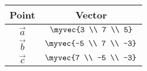 \begin{tabular}{|c|c|}
\hline
Point & Vector \\
\hline
$\vec{a}$ & $\myvec{3 \\ 7 \\ 5}$ \\
\hline
$\vec{b}$ & $\myvec{-5 \\ 7 \\ -3}$ \\
\hline
$\vec{c}$ & $\myvec{7 \\ -5 \\ -3}$ \\
\hline
\end{tabular}
